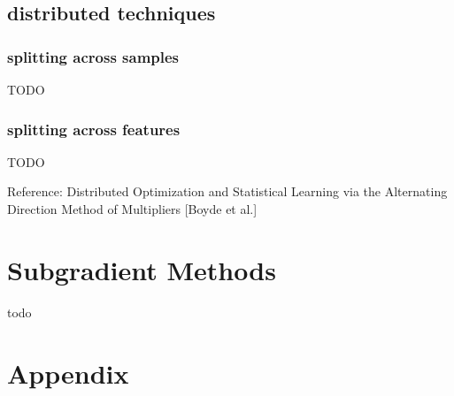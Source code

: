 \documentclass[8pt]{extarticle}
\begin{document}
\begin{multicols*}{2}
  \subsection{distributed techniques}

  \subsubsection{splitting across samples}
  TODO

  \subsubsection{splitting across features}
  TODO
  
  Reference: Distributed Optimization and Statistical Learning via the Alternating Direction Method of Multipliers [Boyde et al.]
  
  \vfill\null
  
  \pagebreak

  \section{Subgradient Methods}

  todo

  \vfill\null
  
  \pagebreak
  
  \section{Appendix}


\end{multicols*}
\end{document}
